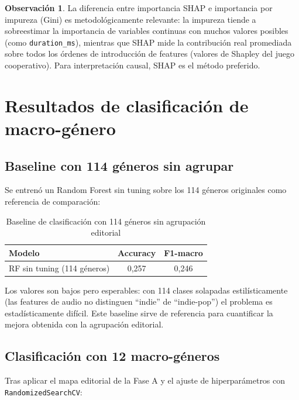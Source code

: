 \documentclass[12pt, a4paper, twoside]{book}
\theoremstyle{definition}
\newtheorem{observacion}{Observación}[chapter]
\begin{document}
\begin{observacion}
La diferencia entre importancia SHAP e importancia por impureza (Gini) es
metodológicamente relevante: la impureza tiende a sobreestimar la importancia
de variables continuas con muchos valores posibles (como \texttt{duration\_ms}),
mientras que SHAP mide la contribución real promediada sobre todos los órdenes
de introducción de features (valores de Shapley del juego cooperativo). Para
interpretación causal, SHAP es el método preferido.
\end{observacion}

\section{Resultados de clasificación de macro-género}

\subsection{Baseline con 114 géneros sin agrupar}

Se entrenó un Random Forest sin tuning sobre los 114 géneros originales como
referencia de comparación:

\begin{table}[H]
\centering
\caption{Baseline de clasificación con 114 géneros sin agrupación editorial}
\label{tab:baseline_clf}
\begin{tabular}{lcc}
\toprule
\textbf{Modelo} & \textbf{Accuracy} & \textbf{F1-macro} \\
\midrule
RF sin tuning (114 géneros) & 0{,}257 & 0{,}246 \\
\bottomrule
\end{tabular}
\end{table}

Los valores son bajos pero esperables: con 114 clases solapadas estilísticamente
(las features de audio no distinguen ``indie'' de ``indie-pop'') el problema es
estadísticamente difícil. Este baseline sirve de referencia para cuantificar la
mejora obtenida con la agrupación editorial.

\subsection{Clasificación con 12 macro-géneros}

Tras aplicar el mapa editorial de la Fase A y el ajuste de hiperparámetros
con \texttt{RandomizedSearchCV}:
\end{document}
